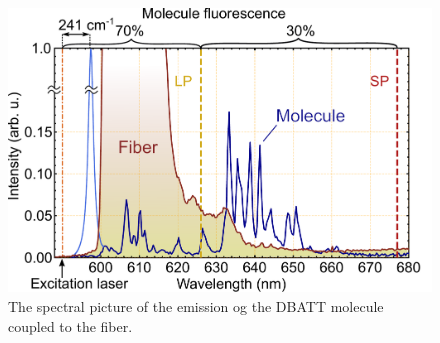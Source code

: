 \documentclass[twocolumn]{article}
\begin{document}
\begin{figure}[h]
\centering
\includegraphics[width=1.\linewidth]{images/spectrum_corrected.pdf}

\caption{The spectral picture of the emission og the DBATT molecule coupled to the fiber.\label{fig: signal}}
\end{figure}

\newpage
\renewcommand{\refname}{}
\printbibliography
\end{document}
